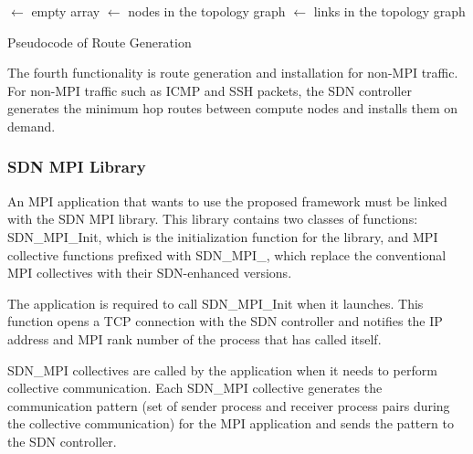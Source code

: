 \begin{algorithm}

    \Routes $\gets$ empty array\;
    \Nodes $\gets$ nodes in the topology graph\;
    \Links $\gets$ links in the topology graph\;


    \caption{Pseudocode of Route Generation}%
    \label{lst:code-generate-route}
\end{algorithm}

The fourth functionality is route generation and installation for
non-MPI traffic. For non-MPI traffic such as ICMP and SSH packets, the
SDN controller generates the minimum hop routes between compute nodes
and installs them on demand.

\subsubsection{SDN MPI Library}

An MPI application that wants to use the proposed framework must be linked
with the SDN MPI library. This library contains two classes of functions:
SDN\_MPI\_Init, which is the initialization function for the library, and
MPI collective functions prefixed with SDN\_MPI\_, which replace the
conventional MPI collectives with their SDN-enhanced versions.

The application is required to call SDN\_MPI\_Init when it launches. This
function opens a TCP connection with the SDN controller and notifies the IP
address and MPI rank number of the process that has called itself.

SDN\_MPI collectives are called by the application when it needs to perform
collective communication. Each SDN\_MPI collective generates the communication
pattern (set of sender process and receiver process pairs during the
collective communication) for the MPI application and sends the pattern to the
SDN controller.

